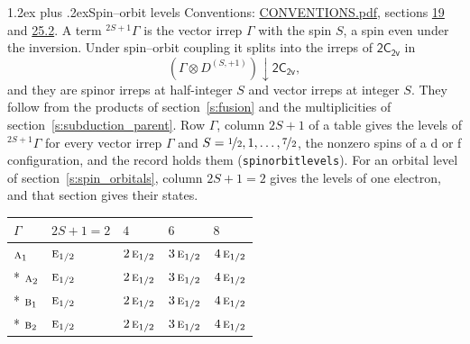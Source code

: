 \documentclass[10pt,a4paper]{article}
\makeatletter
\renewcommand\section{\@startsection{section}{1}{\z@}{-3ex plus -1ex minus -.2ex}%
  {1.2ex plus .2ex}{\normalfont\large\sffamily\bfseries\color{parttitle}}}
\numberwithin{equation}{section}
\newcommand{\grp}[1]{\mathsf{#1}}
\newcommand{\irr}[1]{\text{\normalfont\scshape #1}}
\newcommand{\restr}[2]{#1\!\downarrow#2}
\newcommand{\irrJp}[2]{D^{(#1,#2)}}
\newcommand{\irrprod}{\otimes}
\newcommand{\term}[2]{{}^{#1}#2}
\makeatother
\begin{document}
\section{Spin--orbit levels}\label{s:spin_orbit}
Conventions: \href{../../CONVENTIONS.pdf}{CONVENTIONS.pdf}, sections \href{../../../rotation/CONVENTIONS.pdf\#conv.19}{19} and \href{../../CONVENTIONS.pdf\#conv.25.2}{25.2}.
\leavevmode\label{n:local.spin}\label{n:symbol.term}A term $\term{2S+1}{\Gamma}$ is the vector irrep $\Gamma$ with the spin $S$, a spin even under the inversion. Under spin--orbit coupling it splits into the irreps of $\grp{2C_{2v}}$ in
\begin{equation}\label{e:spinorbit}\restr{(\Gamma \irrprod \irrJp{S}{+1})}{\grp{2C_{2v}}},\end{equation}
and they are spinor irreps at half-integer $S$ and vector irreps at integer $S$. They follow from the products of section~\ref{s:fusion} and the multiplicities of section~\ref{s:subduction_parent}. Row $\Gamma$, column $2S + 1$ of a table gives the levels of $\term{2S+1}{\Gamma}$ for every vector irrep $\Gamma$ and $S = \nicefrac{1}{2}, 1, \dots, \nicefrac{7}{2}$, the nonzero spins of a d or f configuration, and the record holds them (\texttt{spinorbitlevels}). For an orbital level of section~\ref{s:spin_orbitals}, column $2S + 1 = 2$ gives the levels of one electron, and that section gives their states.
{\small\setlength{\tabcolsep}{3pt}\begin{longtable}{@{}lllll@{}}\toprule
$\Gamma$ & $2S + 1 = 2$ & $4$ & $6$ & $8$\\\midrule\endhead
\bottomrule\endfoot\endlastfoot
$\irr{a}_{1}$ & $\irr{e}_{1/2}$ & $2\,\irr{e}_{1/2}$ & $3\,\irr{e}_{1/2}$ & $4\,\irr{e}_{1/2}$\\*
$\irr{a}_{2}$ & $\irr{e}_{1/2}$ & $2\,\irr{e}_{1/2}$ & $3\,\irr{e}_{1/2}$ & $4\,\irr{e}_{1/2}$\\*
$\irr{b}_{1}$ & $\irr{e}_{1/2}$ & $2\,\irr{e}_{1/2}$ & $3\,\irr{e}_{1/2}$ & $4\,\irr{e}_{1/2}$\\*
$\irr{b}_{2}$ & $\irr{e}_{1/2}$ & $2\,\irr{e}_{1/2}$ & $3\,\irr{e}_{1/2}$ & $4\,\irr{e}_{1/2}$\\
\bottomrule\end{longtable}}
\end{document}
